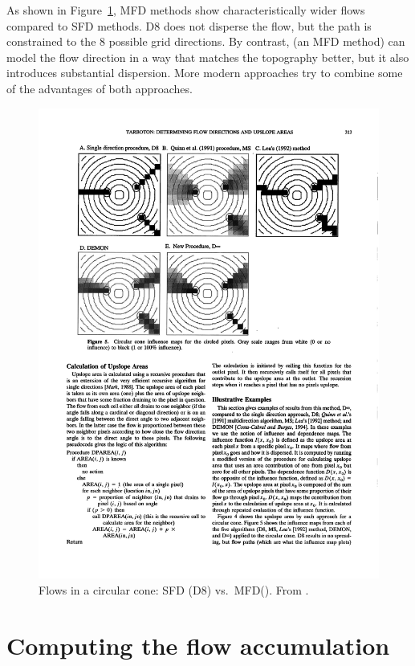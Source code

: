 As shown in Figure~\ref{fig:dispersion}, MFD methods show characteristically wider flows compared to SFD methods.
D8 does not disperse the flow, but the path is constrained to the 8 possible grid directions.
By contrast, \citet{Quinn91} (an MFD method) can model the flow direction in a way that matches the topography better, but it also introduces substantial dispersion.
More modern approaches try to combine some of the advantages of both approaches.

\begin{figure}[htbp]
\centering
\includegraphics[width=0.95\linewidth]{figs/dispersion.pdf}
\caption{Flows in a circular cone: SFD (D8) vs.\ MFD\@ (\citet{Quinn91}). From \citet{Tarborton97}.}%
\label{fig:dispersion}
\end{figure}

\section[Computing flow accumulation]{Computing the flow accumulation}%
\label{se:accumulation}

